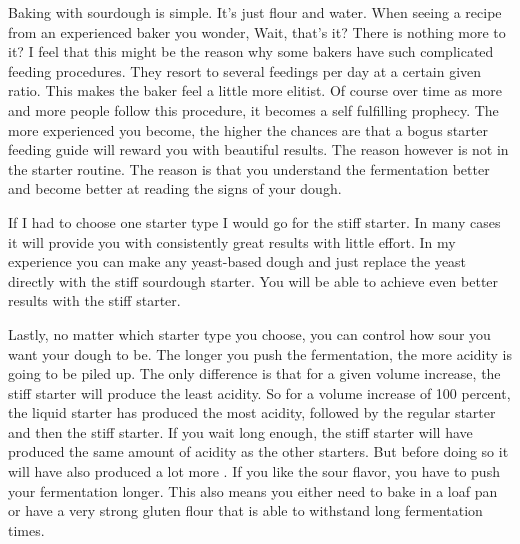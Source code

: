 Baking with sourdough is simple. It's just flour and water. When seeing a recipe
from an experienced baker you wonder, Wait, that's it? There is nothing more
to it? I feel that this might be the reason why some bakers have such complicated
feeding procedures. They resort to several feedings per day at a certain given ratio.
This makes the baker feel a little more elitist. Of course over time as
more and more people follow this procedure, it becomes a self fulfilling prophecy.
The more experienced you become, the higher the chances are that a bogus starter
feeding guide will reward you with beautiful results. The reason however is
not in the starter routine. The reason is that you understand the fermentation better
and become better at reading the signs of your dough.

If I had to choose one starter type I would go for the stiff starter. In many cases
it will provide you with consistently great results with little effort.
In my experience you can make any yeast-based dough and just replace
the yeast directly with the stiff sourdough starter. You will be able
to achieve even better results with the stiff starter.

Lastly, no matter which starter type you choose, you can control how sour
you want your dough to be. The longer you push the fermentation, the more
acidity is going to be piled up. The only difference is that for a given
volume increase, the stiff starter will produce the least acidity. So for a
volume increase of 100 percent, the liquid starter has produced the most acidity,
followed by the regular starter and then the stiff starter. If you wait long
enough, the stiff starter will have produced the same amount of acidity as the
other starters. But before doing so it will have also produced a lot more . If
you like the sour flavor, you have to push your fermentation longer. This also
means you either need to bake in a loaf pan or have a very strong gluten flour
that is able to withstand long fermentation times.
